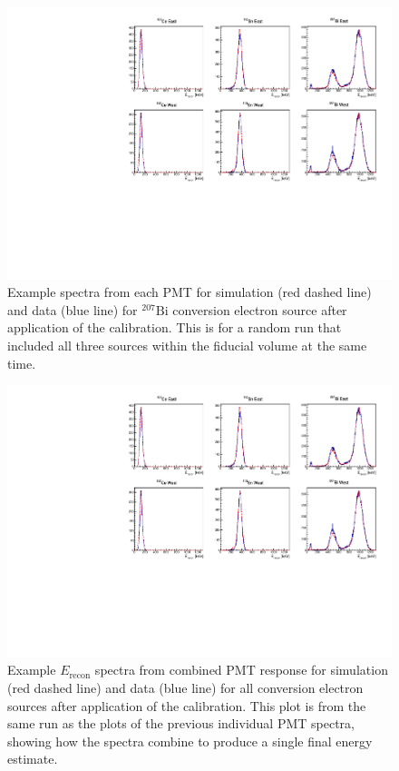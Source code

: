 \begin{figure}
  \centering
  \includegraphics[scale=1,page=4]{4-UCNACalibrations/run_17523.pdf}
  \caption{Example spectra from each PMT for simulation (red dashed line) and data (blue line) for $^{207}\mathrm{Bi}$ conversion electron source
    after application of the calibration. This is for a random run that included all three sources within the fiducial
    volume at the same time.}
  \label{fig:Bi_spectra}
\end{figure}

\begin{figure}
  \centering
  \includegraphics[scale=1,page=1]{4-UCNACalibrations/run_17523.pdf}
  \caption{Example $E_{\mathrm{recon}}$ spectra from combined PMT response
    for simulation (red dashed line) and data (blue line) for all conversion electron sources
    after application of the calibration. This plot is from the same run as the plots of the previous individual
    PMT spectra, showing how the spectra combine to produce a single final energy estimate.}
  \label{fig:Erecon_spectra}
\end{figure}



